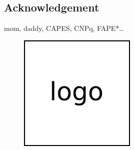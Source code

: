 \documentclass{sciposter}
\begin{document}
\begin{multicols}{3}
\section{Acknowledgement}
mom, daddy, CAPES, CNPq, FAPE*\ldots

\begin{figure}
	\includegraphics[width=0.5\textwidth]{fig/logo.png}
\end{figure}


\end{multicols}
\end{document}
